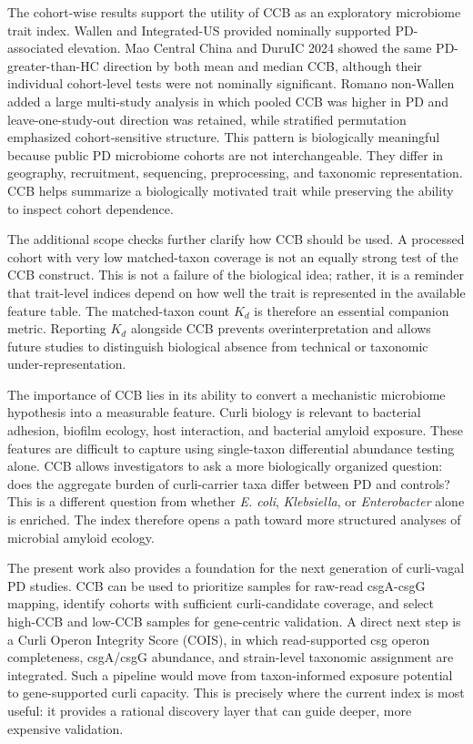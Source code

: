 \documentclass[11pt]{article}
\begin{document}
The cohort-wise results support the utility of CCB as an exploratory microbiome trait index. Wallen and Integrated-US provided nominally supported PD-associated elevation. Mao Central China and DuruIC 2024 showed the same PD-greater-than-HC direction by both mean and median CCB, although their individual cohort-level tests were not nominally significant. Romano non-Wallen added a large multi-study analysis in which pooled CCB was higher in PD and leave-one-study-out direction was retained, while stratified permutation emphasized cohort-sensitive structure. This pattern is biologically meaningful because public PD microbiome cohorts are not interchangeable. They differ in geography, recruitment, sequencing, preprocessing, and taxonomic representation. CCB helps summarize a biologically motivated trait while preserving the ability to inspect cohort dependence.

The additional scope checks further clarify how CCB should be used. A processed cohort with very low matched-taxon coverage is not an equally strong test of the CCB construct. This is not a failure of the biological idea; rather, it is a reminder that trait-level indices depend on how well the trait is represented in the available feature table. The matched-taxon count $K_d$ is therefore an essential companion metric. Reporting $K_d$ alongside CCB prevents overinterpretation and allows future studies to distinguish biological absence from technical or taxonomic under-representation.

The importance of CCB lies in its ability to convert a mechanistic microbiome hypothesis into a measurable feature. Curli biology is relevant to bacterial adhesion, biofilm ecology, host interaction, and bacterial amyloid exposure. These features are difficult to capture using single-taxon differential abundance testing alone. CCB allows investigators to ask a more biologically organized question: does the aggregate burden of curli-carrier taxa differ between PD and controls? This is a different question from whether \emph{E. coli}, \emph{Klebsiella}, or \emph{Enterobacter} alone is enriched. The index therefore opens a path toward more structured analyses of microbial amyloid ecology.

The present work also provides a foundation for the next generation of curli-vagal PD studies. CCB can be used to prioritize samples for raw-read csgA-csgG mapping, identify cohorts with sufficient curli-candidate coverage, and select high-CCB and low-CCB samples for gene-centric validation. A direct next step is a Curli Operon Integrity Score (COIS), in which read-supported csg operon completeness, csgA/csgG abundance, and strain-level taxonomic assignment are integrated. Such a pipeline would move from taxon-informed exposure potential to gene-supported curli capacity. This is precisely where the current index is most useful: it provides a rational discovery layer that can guide deeper, more expensive validation.
\end{document}
